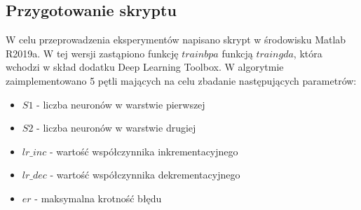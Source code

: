 \documentclass[a4paper, openright, twoside,11pt]{article}
\begin{document}
    \subsection{Przygotowanie skryptu}
    W celu przeprowadzenia eksperymentów napisano skrypt w środowisku Matlab R2019a. W tej wersji zastąpiono funkcję $trainbpa$ funkcją $traingda$, która wchodzi w skład dodatku Deep Learning Toolbox. W algorytmie zaimplementowano 5 pętli mających na celu zbadanie następujących parametrów:
\begin{itemize}
    \item $S1$ - liczba neuronów w warstwie pierwszej
    \item $S2$ - liczba neuronów w warstwie drugiej
    \item $lr\_inc$ - wartość współczynnika inkrementacyjnego
    \item $lr\_dec$ - wartość współczynnika dekrementacyjnego
    \item $er$ - maksymalna krotność błędu
\end{itemize}
\end{document}
